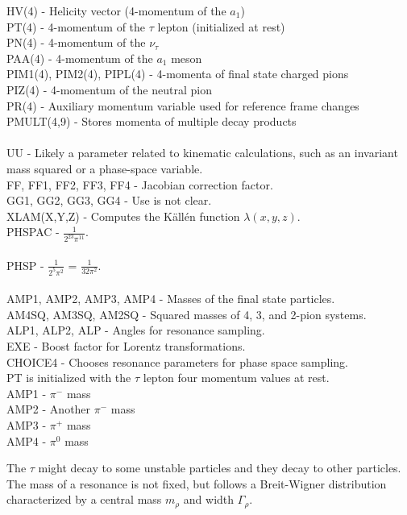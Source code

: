 \documentclass[12pt]{article}
\begin{document}
HV(4) - Helicity vector (4-momentum of the $a_1$) \\
PT(4) - 4-momentum of the $\tau$ lepton (initialized at rest)\\
PN(4) - 4-momentum of the $\nu_\tau$\\
PAA(4) - 4-momentum of the $a_1$ meson\\
PIM1(4), PIM2(4), PIPL(4) - 4-momenta of final state charged pions\\
PIZ(4) - 4-momentum of the neutral pion\\
PR(4) - Auxiliary momentum variable used for reference frame changes\\
PMULT(4,9) - Stores momenta of multiple decay products\\ \\

UU - Likely a parameter related to kinematic calculations, such as an invariant mass squared or a phase-space variable.\\
FF, FF1, FF2, FF3, FF4 - Jacobian correction factor.\\
GG1, GG2, GG3, GG4 - Use is not clear.\\
XLAM(X,Y,Z) - Computes the Källén function $\lambda(x,y,z)$.\\

PHSPAC - $\frac{1}{2^{23}\pi^{11}}$.\\ \\
PHSP - $\frac{1}{2^5 \pi^2}$ = $\frac{1}{32 \pi^2}$.\\ \\
AMP1, AMP2, AMP3, AMP4 - Masses of the final state particles.\\
AM4SQ, AM3SQ, AM2SQ - Squared masses of 4, 3, and 2-pion systems.\\
ALP1, ALP2, ALP - Angles for resonance sampling.\\
EXE - Boost factor for Lorentz transformations.\\

CHOICE4 - Chooses resonance parameters for phase space sampling.\\

PT is initialized with the $\tau$ lepton four momentum values at rest.\\

AMP1 - $\pi^-$  mass\\
AMP2 - Another $\pi^-$  mass\\
AMP3 - $\pi^+$  mass\\
AMP4 - $\pi^0$ mass

The $\tau$ might decay to some unstable particles and they decay to other particles. The mass of a resonance is not fixed, but follows a Breit-Wigner distribution characterized by a central mass $m_\rho$ and width $ \Gamma_\rho$.
\end{document}
